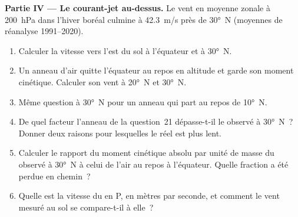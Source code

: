\begin{problem}
\medskip
\noindent\textbf{Partie IV --- Le courant-jet au-dessus.} Le vent en moyenne zonale à \qty{200}{hPa} dans
l'hiver boréal culmine à \qty{42.3}{m/s} près de \ang{30}~N (moyennes de réanalyse
1991--2020).
\begin{enumerate}[resume]
  \item Calculer la vitesse vers l'est du sol à l'équateur et à \ang{30}~N.
  \item Un anneau d'air quitte l'équateur au repos en altitude et garde son moment
        cinétique. Calculer son vent à \ang{20}~N et \ang{30}~N.
  \item Même question à \ang{30}~N pour un anneau qui part au repos de \ang{10}~N.
  \item De quel facteur l'anneau de la question~21 dépasse-t-il le  observé à
        \ang{30}~N~? Donner deux raisons pour lesquelles le  réel est plus lent.
  \item Calculer le rapport du moment cinétique absolu par unité de masse du
         observé à \ang{30}~N à celui de l'air au repos à l'équateur. Quelle
        fraction a été perdue en chemin~?
  \item Quelle est la vitesse du  en P, en mètres par seconde, et comment
        le vent mesuré au sol se compare-t-il à elle~?
\end{enumerate}
\end{problem}
